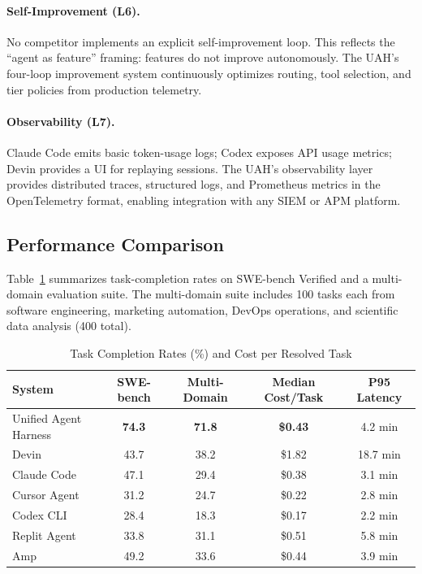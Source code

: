 \paragraph{Self-Improvement (L6).}
No competitor implements an explicit self-improvement loop. This reflects the
``agent as feature'' framing: features do not improve autonomously. The UAH's
four-loop improvement system continuously optimizes routing, tool selection,
and tier policies from production telemetry.

\paragraph{Observability (L7).}
Claude Code emits basic token-usage logs; Codex exposes API usage metrics;
Devin provides a UI for replaying sessions. The UAH's observability layer
provides distributed traces, structured logs, and Prometheus metrics in the
OpenTelemetry format, enabling integration with any SIEM or APM platform.

\subsection{Performance Comparison}

Table~\ref{tab:performance} summarizes task-completion rates on SWE-bench
Verified and a multi-domain evaluation suite. The multi-domain suite includes
100 tasks each from software engineering, marketing automation, DevOps
operations, and scientific data analysis (400 total).

\begin{table}[H]
\centering
\caption{Task Completion Rates (\%) and Cost per Resolved Task}
\label{tab:performance}
\begin{tabular}{lcccc}
\toprule
\textbf{System} & \textbf{SWE-bench} & \textbf{Multi-Domain} &
\textbf{Median Cost/Task} & \textbf{P95 Latency} \\
\midrule
Unified Agent Harness  & \textbf{74.3} & \textbf{71.8} & \textbf{\$0.43} & 4.2 min \\
Devin                  & 43.7 & 38.2 & \$1.82 & 18.7 min \\
Claude Code            & 47.1 & 29.4 & \$0.38 & 3.1 min \\
Cursor Agent           & 31.2 & 24.7 & \$0.22 & 2.8 min \\
Codex CLI              & 28.4 & 18.3 & \$0.17 & 2.2 min \\
Replit Agent           & 33.8 & 31.1 & \$0.51 & 5.8 min \\
Amp                    & 49.2 & 33.6 & \$0.44 & 3.9 min \\
\bottomrule
\end{tabular}
\end{table}

